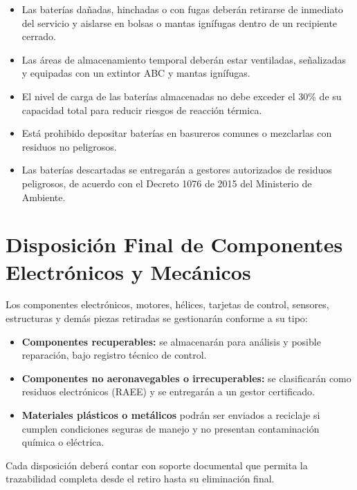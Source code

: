 \begin{itemize}
    \item Las baterías dañadas, hinchadas o con fugas deberán retirarse de inmediato del servicio y aislarse en bolsas o mantas ignífugas dentro de un recipiente cerrado.

    \item Las áreas de almacenamiento temporal deberán estar ventiladas, señalizadas y equipadas con un extintor ABC y mantas ignífugas.

    \item El nivel de carga de las baterías almacenadas no debe exceder el 30\% de su capacidad total para reducir riesgos de reacción térmica.

    \item Está prohibido depositar baterías en basureros comunes o mezclarlas con residuos no peligrosos.

    \item Las baterías descartadas se entregarán a gestores autorizados de residuos peligrosos, de acuerdo con el Decreto 1076 de 2015 del Ministerio de Ambiente.
\end{itemize}

\section{Disposición Final de Componentes Electrónicos y Mecánicos}
Los componentes electrónicos, motores, hélices, tarjetas de control, sensores, estructuras y demás piezas retiradas se gestionarán conforme a su tipo:

\begin{itemize}
    \item \textbf{Componentes recuperables:} se almacenarán para análisis y posible reparación, bajo registro técnico de control.

    \item \textbf{Componentes no aeronavegables o irrecuperables:} se clasificarán como residuos electrónicos (RAEE) y se entregarán a un gestor certificado.

    \item \textbf{Materiales plásticos o metálicos} podrán ser enviados a reciclaje si cumplen condiciones seguras de manejo y no presentan contaminación química o eléctrica.
\end{itemize}

Cada disposición deberá contar con soporte documental que permita la trazabilidad completa desde el retiro hasta su eliminación final.

